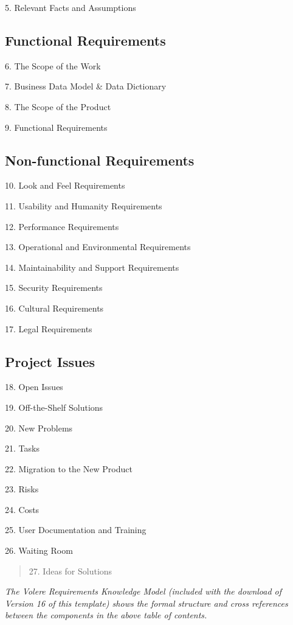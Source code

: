 \documentclass[
]{article}
\begin{document}
5. Relevant Facts and Assumptions

\hypertarget{functional-requirements}{%
\subsection{Functional Requirements}\label{functional-requirements}}

6. The Scope of the Work

7. Business Data Model \& Data Dictionary

8. The Scope of the Product

9. Functional Requirements

\hypertarget{non-functional-requirements}{%
\subsection{Non-functional
Requirements}\label{non-functional-requirements}}

10. Look and Feel Requirements

11. Usability and Humanity Requirements

12. Performance Requirements

13. Operational and Environmental Requirements

14. Maintainability and Support Requirements

15. Security Requirements

16. Cultural Requirements

17. Legal Requirements

\hypertarget{project-issues}{%
\subsection{Project Issues}\label{project-issues}}

18. Open Issues

19. Off-the-Shelf Solutions

20. New Problems

21. Tasks

22. Migration to the New Product

23. Risks

24. Costs

25. User Documentation and Training

26. Waiting Room

\begin{quote}
27. Ideas for Solutions
\end{quote}

\emph{The Volere Requirements Knowledge Model (included with the
download of Version 16 of this template) shows the formal structure and
cross references between the components in the above table of contents.}
\end{document}
